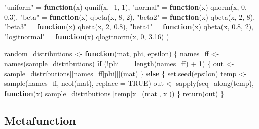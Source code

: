 \documentclass[
  11pt,
]{article}
\newenvironment{Shaded}{\begin{snugshade}}{\end{snugshade}}
\newcommand{\AttributeTok}[1]{\textcolor[rgb]{0.77,0.63,0.00}{#1}}
\newcommand{\ConstantTok}[1]{\textcolor[rgb]{0.00,0.00,0.00}{#1}}
\newcommand{\ControlFlowTok}[1]{\textcolor[rgb]{0.13,0.29,0.53}{\textbf{#1}}}
\newcommand{\DecValTok}[1]{\textcolor[rgb]{0.00,0.00,0.81}{#1}}
\newcommand{\FloatTok}[1]{\textcolor[rgb]{0.00,0.00,0.81}{#1}}
\newcommand{\FunctionTok}[1]{\textcolor[rgb]{0.00,0.00,0.00}{#1}}
\newcommand{\NormalTok}[1]{#1}
\newcommand{\OtherTok}[1]{\textcolor[rgb]{0.56,0.35,0.01}{#1}}
\newcommand{\SpecialCharTok}[1]{\textcolor[rgb]{0.00,0.00,0.00}{#1}}
\newcommand{\StringTok}[1]{\textcolor[rgb]{0.31,0.60,0.02}{#1}}
\begin{document}
\begin{Shaded}
\begin{Highlighting}[]
  \StringTok{"uniform"} \OtherTok{=} \ControlFlowTok{function}\NormalTok{(x) }\FunctionTok{qunif}\NormalTok{(x, }\SpecialCharTok{{-}}\DecValTok{1}\NormalTok{, }\DecValTok{1}\NormalTok{),}
  \StringTok{"normal"} \OtherTok{=} \ControlFlowTok{function}\NormalTok{(x) }\FunctionTok{qnorm}\NormalTok{(x, }\DecValTok{0}\NormalTok{, }\FloatTok{0.3}\NormalTok{),}
  \StringTok{"beta"} \OtherTok{=} \ControlFlowTok{function}\NormalTok{(x) }\FunctionTok{qbeta}\NormalTok{(x, }\DecValTok{8}\NormalTok{, }\DecValTok{2}\NormalTok{),}
  \StringTok{"beta2"} \OtherTok{=} \ControlFlowTok{function}\NormalTok{(x) }\FunctionTok{qbeta}\NormalTok{(x, }\DecValTok{2}\NormalTok{, }\DecValTok{8}\NormalTok{),}
  \StringTok{"beta3"} \OtherTok{=} \ControlFlowTok{function}\NormalTok{(x) }\FunctionTok{qbeta}\NormalTok{(x, }\DecValTok{2}\NormalTok{, }\FloatTok{0.8}\NormalTok{),}
  \StringTok{"beta4"} \OtherTok{=} \ControlFlowTok{function}\NormalTok{(x) }\FunctionTok{qbeta}\NormalTok{(x, }\FloatTok{0.8}\NormalTok{, }\DecValTok{2}\NormalTok{),}
  \StringTok{"logitnormal"} \OtherTok{=} \ControlFlowTok{function}\NormalTok{(x) }\FunctionTok{qlogitnorm}\NormalTok{(x, }\DecValTok{0}\NormalTok{, }\FloatTok{3.16}\NormalTok{)}
\NormalTok{)}

\NormalTok{random\_distributions }\OtherTok{\textless{}{-}} \ControlFlowTok{function}\NormalTok{(mat, phi, epsilon) \{}
\NormalTok{  names\_ff }\OtherTok{\textless{}{-}} \FunctionTok{names}\NormalTok{(sample\_distributions)}
  \ControlFlowTok{if}\NormalTok{ (}\SpecialCharTok{!}\NormalTok{phi }\SpecialCharTok{==} \FunctionTok{length}\NormalTok{(names\_ff) }\SpecialCharTok{+} \DecValTok{1}\NormalTok{) \{}
\NormalTok{    out }\OtherTok{\textless{}{-}}\NormalTok{ sample\_distributions[[names\_ff[phi]]](mat)}
\NormalTok{  \} }\ControlFlowTok{else}\NormalTok{ \{}
    \FunctionTok{set.seed}\NormalTok{(epsilon)}
\NormalTok{    temp }\OtherTok{\textless{}{-}} \FunctionTok{sample}\NormalTok{(names\_ff, }\FunctionTok{ncol}\NormalTok{(mat), }\AttributeTok{replace =} \ConstantTok{TRUE}\NormalTok{)}
\NormalTok{    out }\OtherTok{\textless{}{-}} \FunctionTok{sapply}\NormalTok{(}\FunctionTok{seq\_along}\NormalTok{(temp), }\ControlFlowTok{function}\NormalTok{(x) sample\_distributions[[temp[x]]](mat[, x]))}
\NormalTok{  \}}
  \FunctionTok{return}\NormalTok{(out)}
\NormalTok{\}}
\end{Highlighting}
\end{Shaded}

\hypertarget{metafunction}{%
\subsection{Metafunction}\label{metafunction}}
\end{document}
